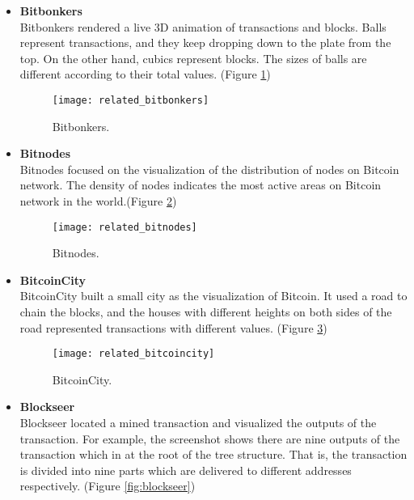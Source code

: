 \begin{itemize}
    \item \textbf{Bitbonkers} \cite{bitbonkers} \\
        Bitbonkers rendered a live 3D animation of transactions and blocks. Balls represent transactions, and they keep dropping down to the plate from the top. On the other hand, cubics represent blocks. The sizes of balls are different according to their total values. (Figure \ref{fig:bitbonkers})
        \begin{figure}[htb]
            \centering
            \texttt{[image: related\_bitbonkers]}
            \caption{Bitbonkers.}
            \label{fig:bitbonkers}
        \end{figure}
    \item \textbf{Bitnodes} \cite{bitnodes} \\
        Bitnodes focused on the visualization of the distribution of nodes on Bitcoin network. The density of nodes indicates the most active areas on Bitcoin network in the world.(Figure \ref{fig:bitnodes})
        \begin{figure}[htb]
            \centering
            \texttt{[image: related\_bitnodes]}
            \caption{Bitnodes.}
            \label{fig:bitnodes}
        \end{figure}
    \clearpage
    \vspace*{\fill}
    \item \textbf{BitcoinCity} \cite{bitcoincity} \\
        BitcoinCity built a small city as the visualization of Bitcoin. It used a road to chain the blocks, and the houses with different heights on both sides of the road represented transactions with different values. (Figure \ref{fig:bitcoincity})
        \begin{figure}[htb]
            \centering
            \texttt{[image: related\_bitcoincity]}
            \caption{BitcoinCity.}
            \label{fig:bitcoincity}
        \end{figure}
    \item \textbf{Blockseer} \cite{blockseer} \\
        Blockseer located a mined transaction and visualized the outputs of the transaction. For example, the screenshot shows there are nine outputs of the transaction which in at the root of the tree structure. That is, the transaction is divided into nine parts which are delivered to different addresses respectively. (Figure \ref{fig:blockseer})

\end{itemize}
